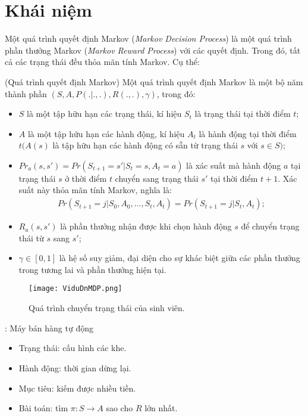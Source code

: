 \section{Khái niệm}
Một quá trình quyết định Markov (\textit{Markov Decision Process}) là một quá trình phần thưởng Markov (\textit{Markov Reward Process}) với các quyết định. Trong đó, tất cả các trạng thái đều thỏa mãn tính Markov. Cụ thể:
\begin{dn}\rm
(Quá trình quyết định Markov) Một quá trình quyết định Markov là một bộ năm thành phần $(S,A,P(.|.,.),R(.,.),\gamma)$, trong đó:
\begin{itemize}
 \item $S$ là một tập hữu hạn các trạng thái, kí hiệu $S_t$ là trạng thái tại thời điểm $t$; 
 \item $A$ là một tập hữu hạn các hành động, kí hiệu $A_t$ là hành động tại thời điểm $t (A(s)$ là tập hữu hạn các hành động có sẵn từ trạng thái $s$ với $s\in S)$;
 \item $Pr_{a}(s,s')=Pr(S_{t+1}=s'|S_t=s,A_t=a)$ là xác suất mà hành động $a$ tại trạng thái $s$ ở thời điểm $t$ chuyển sang trạng thái $s'$ tại thời điểm $t+1$. Xác suất này thỏa mãn tính Markov, nghĩa là:
 \begin{align*}
 Pr(S_{t+1}=j|S_0,A_0,...,S_t,A_t)=Pr(S_{t+1}=j|S_t,A_t);
 \end{align*}
 \item $R_a(s,s')$ là phần thưởng nhận được khi chọn hành động $s$ để chuyển trạng thái từ $s$ sang $s'$;
 \item $\gamma \in [0,1]$ là hệ số suy giảm, đại diện cho sự khác biệt giữa các phần thưởng trong tương lai và phần thưởng hiện tại.
\end{itemize}
\begin{figure}[ht]
    \centering
    \begin{center}
    \texttt{[image: ViduDnMDP.png]}
    \end{center}    
    \caption{Quá trình chuyển trạng thái của sinh viên.}
    \label{fig:ViduDnMDP}
\end{figure}
\end{dn}
\begin{vd} \rm: Máy bán hàng tự động
\begin{itemize}
\item Trạng thái: cấu hình các khe.
\item Hành động: thời gian dừng lại.
\item Mục tiêu: kiếm được nhiều tiền.
\item Bài toán: tìm $\pi:S\to A$ sao cho $R$ lớn nhất.
\end{itemize}
\end{vd}
